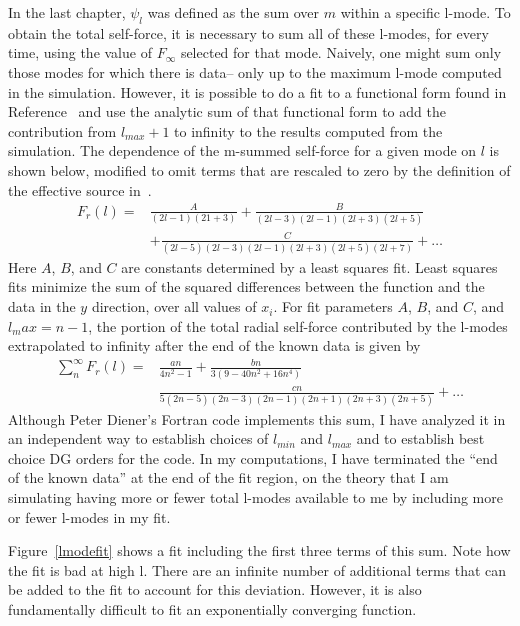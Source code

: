 In the last chapter, $\psi_l$ was defined as the sum over $m$ within a specific l-mode. To obtain the total self-force, it is necessary to sum all of these l-modes, for every time, using the value of $F_{\infty}$ selected for that mode. Naively, one might sum only those modes for which there is data-- only up to the maximum l-mode computed in the simulation. However, it is possible to do a fit to a functional form found in Reference~\cite{heffernan_ottewil_wardell_modesum_basisForCode} and use the analytic sum of that functional form to add the contribution from $l_{max}+1$ to infinity to the results computed from the simulation. The dependence of the m-summed self-force for a given mode on $l$ is shown below, modified to omit terms that are rescaled to zero by the definition of the effective source in~\cite{wardell_vega_thornburg_diener}.
\begin{eqnarray}
  F_r(l)=&\frac{A}{(2l-1)(21+3)}+\frac{B}{(2l-3)(2l-1)(2l+3)(2l+5)}\nonumber \\
  &+\frac{C}{(2l-5)(2l-3)(2l-1)(2l+3)(2l+5)(2l+7)}+\ldots
  \label{lmodefitsum}
\end{eqnarray}
Here $A$, $B$, and $C$ are constants determined by a least squares fit. Least squares fits minimize the sum of the squared differences between the function and the data in the $y$ direction, over all values of $x_i$. For fit parameters $A$, $B$, and $C$, and $l_max=n-1$, the portion of the total radial self-force contributed by the l-modes extrapolated to infinity after the end of the known data is given by
\begin{eqnarray}
  \sum_n^{\infty} F_r(l) = &\frac{an}{4n^2-1}+\frac{bn}{3(9-40n^2+16n^4)}\nonumber\\
  &\frac{cn}{5(2n-5)(2n-3)(2n-1)(2n+1)(2n+3)(2n+5)}+\ldots
\end{eqnarray}
Although Peter Diener's Fortran code implements this sum, I have analyzed it in an independent way to establish choices of $l_{min}$ and $l_{max}$ and to establish best choice DG orders for the code. In my computations, I have terminated the ``end of the known data'' at the end of the fit region, on the theory that I am simulating having more or fewer total l-modes available to me by including more or fewer l-modes in my fit.

Figure~\ref{lmodefit} shows a fit including the first three terms of this sum. Note how the fit is bad at high l. There are an infinite number of additional terms that can be added to the fit to account for this deviation. However, it is also fundamentally difficult to fit an exponentially converging function. 


